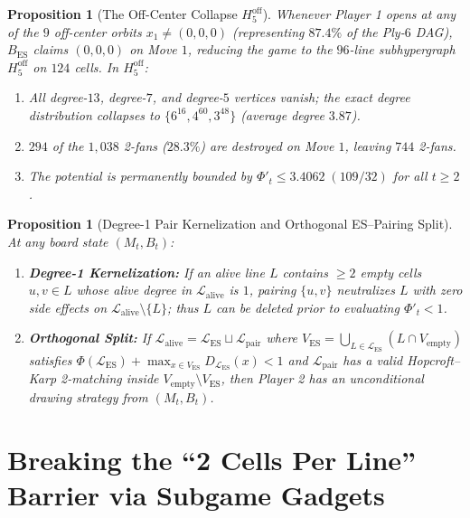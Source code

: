 \documentclass[11pt,a4paper]{article}
\newtheorem{proposition}[theorem]{Proposition}
\theoremstyle{definition}
\theoremstyle{remark}
\begin{document}
\begin{proposition}[The Off-Center Collapse $H_5^{\mathrm{off}}$]
\label{prop:off_center}
Whenever Player 1 opens at any of the $9$ off-center orbits $x_1 \neq (0,0,0)$ (representing $87.4\%$ of the Ply-$6$ DAG), $B_{\mathrm{ES}}$ claims $(0,0,0)$ on Move $1$, reducing the game to the $96$-line subhypergraph $H_5^{\mathrm{off}}$ on $124$ cells. In $H_5^{\mathrm{off}}$:
\begin{enumerate}[noitemsep]
    \item All degree-$13$, degree-$7$, and degree-$5$ vertices vanish; the exact degree distribution collapses to $\{6^{16}, 4^{60}, 3^{48}\}$ (average degree $3.87$).
    \item $294$ of the $1,038$ 2-fans ($28.3\%$) are destroyed on Move $1$, leaving $744$ 2-fans.
    \item The potential is permanently bounded by $\Phi'_t \le 3.4062\;(109/32)$ for all $t \ge 2$.
\end{enumerate}
\end{proposition}

\begin{proposition}[Degree-1 Pair Kernelization and Orthogonal ES--Pairing Split]
\label{prop:hybrid_split}
At any board state $(M_t, B_t)$:
\begin{enumerate}[noitemsep]
    \item \textbf{Degree-1 Kernelization:} If an alive line $L$ contains $\ge 2$ empty cells $u, v \in L$ whose alive degree in $\mathcal{L}_{\mathrm{alive}}$ is $1$, pairing $\{u, v\}$ neutralizes $L$ with zero side effects on $\mathcal{L}_{\mathrm{alive}} \setminus \{L\}$; thus $L$ can be deleted prior to evaluating $\Phi'_t < 1$.
    \item \textbf{Orthogonal Split:} If $\mathcal{L}_{\mathrm{alive}} = \mathcal{L}_{\mathrm{ES}} \sqcup \mathcal{L}_{\mathrm{pair}}$ where $V_{\mathrm{ES}} = \bigcup_{L \in \mathcal{L}_{\mathrm{ES}}} (L \cap V_{\mathrm{empty}})$ satisfies $\Phi(\mathcal{L}_{\mathrm{ES}}) + \max_{x \in V_{\mathrm{ES}}} D_{\mathcal{L}_{\mathrm{ES}}}(x) < 1$ and $\mathcal{L}_{\mathrm{pair}}$ has a valid Hopcroft--Karp 2-matching inside $V_{\mathrm{empty}} \setminus V_{\mathrm{ES}}$, then Player 2 has an unconditional drawing strategy from $(M_t, B_t)$.
\end{enumerate}
\end{proposition}

\section{Breaking the ``2 Cells Per Line'' Barrier via Subgame Gadgets}
\end{document}
